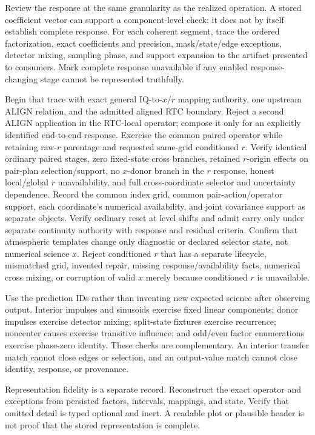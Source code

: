 \documentclass[10pt]{article}
\begin{document}
Review the response at the same granularity as the realized operation.  A
stored coefficient vector can support a component-level check; it does not by
itself establish complete response.  For each coherent segment, trace the
ordered factorization, exact coefficients and precision, mask/state/edge
exceptions, detector mixing, sampling phase, and support expansion to the
artifact presented to consumers.  Mark complete response unavailable if any
enabled response-changing stage cannot be represented truthfully.

Begin that trace with exact general IQ-to-$x/r$ mapping authority, one upstream
ALIGN relation, and the admitted aligned RTC boundary.  Reject a second ALIGN
application in the RTC-local operator; compose it only for an explicitly
identified end-to-end response.  Exercise the common paired operator while
retaining raw-$r$ parentage and requested same-grid conditioned
$r$.  Verify identical ordinary paired stages, zero fixed-state cross
branches, retained $r$-origin effects on pair-plan selection/support, no
$x$-donor branch in the $r$ response, honest local/global $r$ unavailability,
and full cross-coordinate selector and uncertainty dependence.  Record the
common index grid, common pair-action/operator support, each coordinate's
numerical availability, and joint covariance support as separate objects.
Verify ordinary reset
at level shifts and admit carry only under separate continuity authority with
response and residual criteria.  Confirm that atmospheric templates change only
diagnostic or declared selector state, not numerical science $x$.  Reject
conditioned $r$ that has a separate lifecycle, mismatched grid, invented
repair, missing response/availability facts, numerical cross mixing, or
corruption of valid $x$ merely because conditioned $r$ is unavailable.

Use the prediction IDs rather than inventing new expected science after
observing output.  Interior impulses and sinusoids exercise fixed linear
components; donor impulses exercise detector mixing; split-state fixtures
exercise recurrence; noncenter causes exercise transitive influence; and
odd/even factor enumerations exercise phase-zero identity.  These checks are
complementary.  An interior transfer match cannot close edges or selection,
and an output-value match cannot close identity, response, or provenance.

Representation fidelity is a separate record.  Reconstruct the exact
operator and exceptions from persisted factors, intervals, mappings, and
state.  Verify that omitted detail is typed optional and inert.  A readable
plot or plausible header is not proof that the stored representation is
complete.
\end{document}
